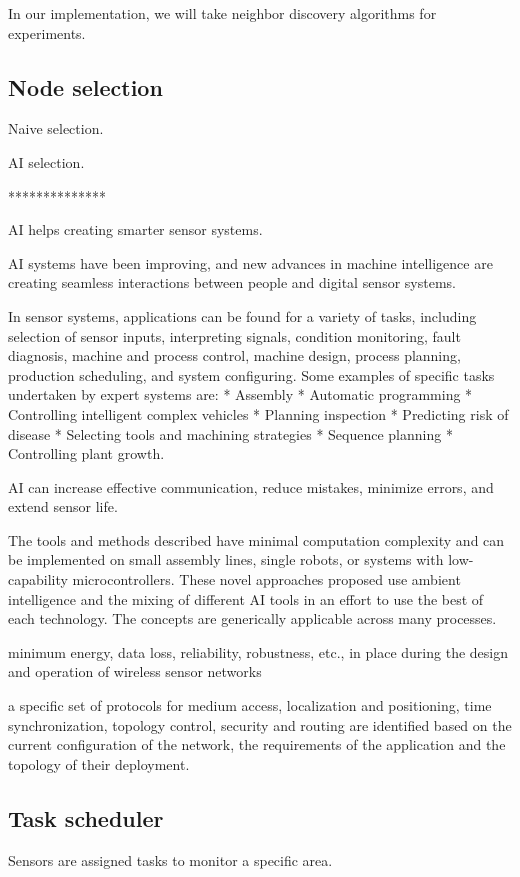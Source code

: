 In our implementation, we will take neighbor discovery algorithms for experiments.
\fi



\subsection{Node selection}

Naive selection.

AI selection.


**************

AI helps creating smarter sensor systems.

AI systems have been improving, and new advances in machine intelligence are creating seamless interactions between people and digital sensor systems.

 In sensor systems, applications can be found for a variety of tasks, including selection of sensor inputs, interpreting signals, condition monitoring, fault diagnosis, machine and process control, machine design, process planning, production scheduling, and system configuring. Some examples of specific tasks undertaken by expert systems are:
* Assembly 
* Automatic programming 
* Controlling intelligent complex vehicles  
* Planning inspection 
* Predicting risk of disease 
* Selecting tools and machining strategies 
* Sequence planning 
* Controlling plant growth. 

AI can increase effective communication, reduce mistakes, minimize errors, and extend sensor life.



The tools and methods described have minimal computation complexity and can be implemented on small assembly lines, single robots, or systems with low-capability microcontrollers. These novel approaches proposed use ambient intelligence and the mixing of different AI tools in an effort to use the best of each technology. The concepts are generically applicable across many processes.


minimum energy, data loss, reliability, robustness, etc., in place during the design and operation of wireless sensor networks

a specific set of protocols for medium access, localization and positioning, time synchronization, topology control, security and routing are identified based on the current configuration of the network, the requirements of the application and the topology of their deployment.

\subsection{Task scheduler}
Sensors are assigned tasks to monitor a specific area.

